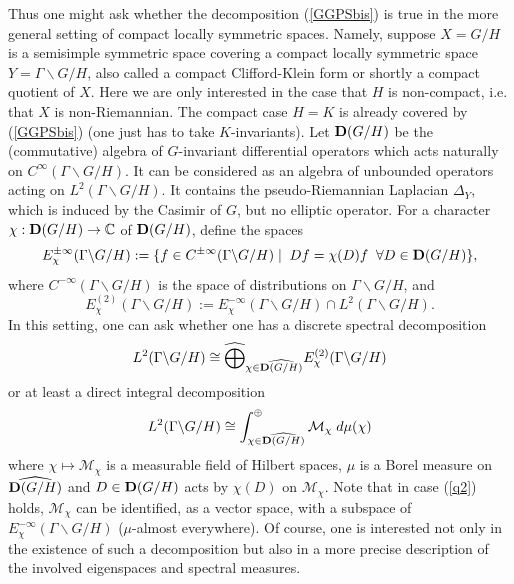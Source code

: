 \documentclass[10]{amsart}
\theoremstyle{remark}
\theoremstyle{definition}
\numberwithin{equation}{section}
\begin{document}
Thus one might ask whether the decomposition (\ref{GGPSbis}) is true in the more general setting of compact locally symmetric spaces. Namely, suppose $X=G/H$ is a semisimple symmetric space covering a compact locally symmetric space $Y=\Gamma\backslash G/H$, also called a compact Clifford-Klein form or shortly a compact quotient of $X$. Here we are only interested in the case that $H$ is non-compact, i.e. that $X$ is non-Riemannian. The compact case $H=K$ is already covered by (\ref{GGPSbis}) (one just has to take $K$-invariants). Let ${\bf D}(G/H)$ be the (commutative) algebra of $G$-invariant differential operators which acts naturally on $C^\infty(\Gamma\backslash G/H)$. It can be considered as an algebra of unbounded operators acting on $L^2(\Gamma\backslash G/H)$. 
It contains the pseudo-Riemannian Laplacian $\Delta_Y$, which is induced by the Casimir of $G$, but no elliptic operator. For a character $\chi:{\bf D}(G/H)\rightarrow{\mathbb C}$ of ${\bf D}(G/H)$, define the spaces
%
\begin{equation}\label{q0}
E_{\chi}^{\pm \infty}(\Gamma\backslash G/H):=\{f\in C^{\pm\infty}(\Gamma\backslash G/H)\mid\; Df=\chi(D)f\;\;\forall D\in {\bf D}(G/H)\},
\end{equation}
% 
where $C^{-\infty}(\Gamma\backslash G/H)$ is the space of distributions on $\Gamma\backslash G/H$, and 
$$E^{(2)}_\chi(\Gamma\backslash G/H):=E^{-\infty}_\chi(\Gamma\backslash G/H)\cap L^2(\Gamma\backslash G/H).$$ 
In this setting, one can ask whether one has a discrete spectral decomposition 
%
\begin{equation}\label{q1}
L^2(\Gamma\backslash G/H)\cong \widehat{\bigoplus}_{\chi\in\widehat{{\bf D}(G/H)}}E_{\chi}^{(2)}(\Gamma\backslash G/H)
\end{equation}
% 
or at least a direct integral decomposition
%
\begin{equation}\label{q2}
L^2(\Gamma\backslash G/H)\cong \int^\oplus_{\chi\in\widehat{{\bf D}(G/H)}}{\mathcal M}_\chi\; d\mu(\chi)
\end{equation}
% 
where $\chi\mapsto{\mathcal M}_\chi$ is a measurable field of Hilbert spaces, $\mu$ is a Borel measure on $\widehat{{\bf D}(G/H)}$ and $D\in {\bf D}(G/H)$ acts by $\chi(D)$ on ${\mathcal M}_\chi$. Note that in case (\ref{q2}) holds, ${\mathcal M}_\chi$ can be identified, as a vector space, with a subspace of $E_{\chi}^{-\infty}(\Gamma\backslash G/H)$ ($\mu$-almost everywhere). Of course, one is interested not only in the existence of such a decomposition but also in a more precise description of the involved eigenspaces and spectral measures.
\end{document}
